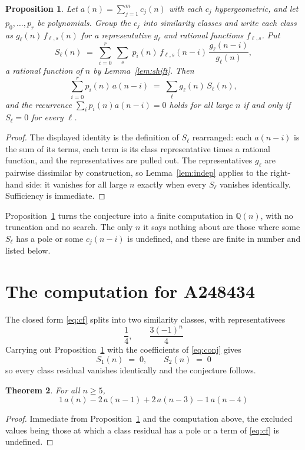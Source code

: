 \documentclass[11pt,a4paper]{article}
\theoremstyle{plain}
\newtheorem{theorem}{Theorem}
\newtheorem{proposition}[theorem]{Proposition}
\theoremstyle{definition}
\begin{document}
\begin{proposition}\label{prop:main}
Let $a(n)=\sum_{j=1}^{m}c_{j}(n)$ with each $c_{j}$ hypergeometric, and let
$p_{0},\dots,p_{r}$ be polynomials. Group the $c_{j}$ into similarity classes and write
each class as $g_{\ell}(n)\,f_{\ell,s}(n)$ for a representative $g_{\ell}$ and rational
functions $f_{\ell,s}$. Put
\[
S_{\ell}(n)\;=\;\sum_{i=0}^{r}\;\sum_{s}\;p_{i}(n)\,f_{\ell,s}(n-i)\,
\frac{g_{\ell}(n-i)}{g_{\ell}(n)} ,
\]
a rational function of $n$ by Lemma~\ref{lem:shift}. Then
\[
\sum_{i=0}^{r}p_{i}(n)\,a(n-i)\;=\;\sum_{\ell}g_{\ell}(n)\,S_{\ell}(n),
\]
and the recurrence $\sum_{i}p_{i}(n)a(n-i)=0$ holds for all large $n$ if and only if
$S_{\ell}=0$ for every $\ell$.
\end{proposition}

\begin{proof}
The displayed identity is the definition of $S_{\ell}$ rearranged: each $a(n-i)$ is the
sum of its terms, each term is its class representative times a rational function, and the
representatives are pulled out. The representatives $g_{\ell}$ are pairwise dissimilar by
construction, so Lemma~\ref{lem:indep} applies to the right-hand side: it vanishes for all
large $n$ exactly when every $S_{\ell}$ vanishes identically. Sufficiency is immediate.
\end{proof}

Proposition~\ref{prop:main} turns the conjecture into a finite computation in
$\mathbb{Q}(n)$, with no truncation and no search. The only $n$ it says nothing about are
those where some $S_{\ell}$ has a pole or some $c_{j}(n-i)$ is undefined, and these are
finite in number and listed below.

\section{The computation for A248434}

The closed form \eqref{eq:cf} splits into two similarity classes, with
representativees
\[
\frac{1}{4},\qquad \frac{3 \left(-1\right)^{n}}{4}
\]
Carrying out Proposition~\ref{prop:main} with the coefficients of \eqref{eq:conj} gives
\[
S_{1}(n)\;=\;0,\qquad S_{2}(n)\;=\;0
\]
so every class residual vanishes identically and the conjecture follows.

\begin{theorem}
For all $n\ge 5$,
\[
1\,a(n) - 2\,a(n-1) + 2\,a(n-3) - 1\,a(n-4)
\]
\end{theorem}

\begin{proof}
Immediate from Proposition~\ref{prop:main} and the computation above, the excluded values
being those at which a class residual has a pole or a term of \eqref{eq:cf} is undefined.
\end{proof}
\end{document}
